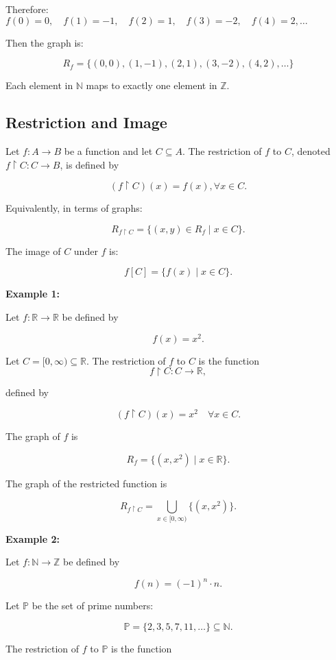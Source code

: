 \documentclass[12pt,a4paper,openany]{article}
\begin{document}
Therefore: $f(0) = 0, \quad f(1) = -1, \quad f(2) = 1, \quad f(3) = -2, \quad f(4) = 2, \ldots$

Then the graph is:

\[R_f = \{(0,0), (1,-1), (2,1), (3,-2), (4,2), \ldots\}\]

Each element in $\mathbb{N}$ maps to exactly one element in $\mathbb{Z}$.

\subsection{Restriction and Image}

Let $f : A \to B$ be a function and let $C \subseteq A$. The restriction of $f$ to $C$, denoted $f\!\restriction C : C \to B$, 
is defined by

\[
(f\!\restriction C)(x) = f(x), \forall x \in C.
\]

Equivalently, in terms of graphs:

\[
R_{f\!\restriction C} 
= \{ (x, y) \in R_f \mid x \in C \}.
\]

The image of $C$ under $f$ is:

\[
f[C] = \{ f(x) \mid x \in C \}.
\]

\textbf{Example 1:} 

Let $f : \mathbb{R} \to \mathbb{R}$ be defined by

\[
f(x) = x^2.
\]

Let $C = [0,\infty) \subseteq \mathbb{R}$. The restriction of $f$ to $C$ is the function
\[
f\!\restriction C : C \to \mathbb{R},
\]

defined by

\[
(f\!\restriction C)(x) = x^2 \quad \forall x \in C.
\]

The graph of $f$ is

\[
R_f = \{ (x, x^2) \mid x \in \mathbb{R} \}.
\]

The graph of the restricted function is

\[
R_{f\!\restriction C}
= \displaystyle\bigcup_{x \in [0,\infty)} \{ (x, x^2) \}.
\]

\textbf{Example 2:} 

Let $f : \mathbb{N} \to \mathbb{Z}$ be defined by

\[
f(n) = (-1)^n \cdot n.
\]

Let $\mathbb{P}$ be the set of prime numbers:

\[
\mathbb{P} = \{2, 3, 5, 7, 11, \dots\} \subseteq \mathbb{N}.
\]

The restriction of $f$ to $\mathbb{P}$ is the function
\end{document}
